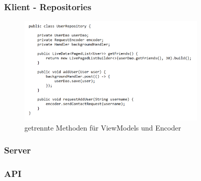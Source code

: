 \documentclass[aspectratio=1610]{beamer}
\begin{document}
	\begin{frame}[plain]
	\frametitle{Klient - Repositories}
	\begin{figure}[h]
		\centering
		\includegraphics[width=0.8\textwidth]{images/UserRepository.PNG}
		\caption{getrennte Methoden für ViewModels und Encoder}
	\end{figure}
	\end{frame}

	\begin{frame}[plain]
		\frametitle{Server}

	\end{frame}

	\begin{frame}[plain]
		\frametitle{API}

	\end{frame}
\end{document}
